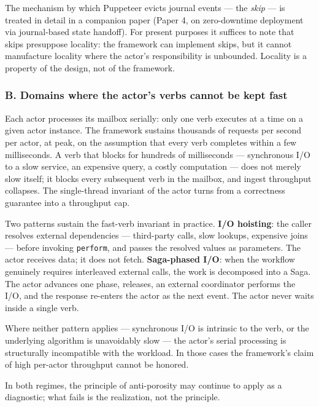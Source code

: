 \documentclass[
]{article}
\let\origtexttt\texttt%
\renewcommand{\texttt}[1]{\origtexttt{\seqsplit{#1}}}%
\let\texttt\origtexttt%
\begin{document}
The mechanism by which Puppeteer evicts journal events --- the
\emph{skip} --- is treated in detail in a companion paper (Paper 4, on
zero-downtime deployment via journal-based state handoff). For present
purposes it suffices to note that skips presuppose locality: the
framework can implement skips, but it cannot manufacture locality where
the actor's responsibility is unbounded. Locality is a property of the
design, not of the framework.

\subsubsection{B. Domains where the actor's verbs cannot be kept
fast}\label{b.-domains-where-the-actors-verbs-cannot-be-kept-fast}

Each actor processes its mailbox serially: only one verb executes at a
time on a given actor instance. The framework sustains thousands of
requests per second per actor, at peak, on the assumption that every
verb completes within a few milliseconds. A verb that blocks for
hundreds of milliseconds --- synchronous I/O to a slow service, an
expensive query, a costly computation --- does not merely slow itself;
it blocks every subsequent verb in the mailbox, and ingest throughput
collapses. The single-thread invariant of the actor turns from a
correctness guarantee into a throughput cap.

Two patterns sustain the fast-verb invariant in practice. \textbf{I/O
hoisting}: the caller resolves external dependencies --- third-party
calls, slow lookups, expensive joins --- before invoking
\texttt{perform}, and passes the resolved values as parameters. The
actor receives data; it does not fetch. \textbf{Saga-phased I/O}: when
the workflow genuinely requires interleaved external calls, the work is
decomposed into a Saga. The actor advances one phase, releases, an
external coordinator performs the I/O, and the response re-enters the
actor as the next event. The actor never waits inside a single verb.

Where neither pattern applies --- synchronous I/O is intrinsic to the
verb, or the underlying algorithm is unavoidably slow --- the actor's
serial processing is structurally incompatible with the workload. In
those cases the framework's claim of high per-actor throughput cannot be
honored.

In both regimes, the principle of anti-porosity may continue to apply as
a diagnostic; what fails is the realization, not the principle.
\end{document}
